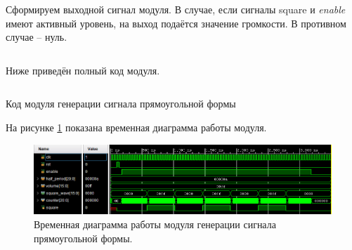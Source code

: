 \begin{listing}[H]
	\inputminted[firstline=24, lastline=33]{SystemVerilog}{code_examples/lab_7/square_code.sv}
\end{listing}

Сформируем выходной сигнал модуля. В случае, если сигналы square и \textit{enable} имеют активный уровень, на выход подаётся значение громкости. В противном случае -- нуль.

% 	

\begin{listing}[H]
	\inputminted[firstline=35, lastline=36]{SystemVerilog}{code_examples/lab_7/square_code.sv}
\end{listing}

Ниже приведён полный код модуля.

% 	

\begin{listing}[H]
	\inputminted{SystemVerilog}{code_examples/lab_7/square_code.sv}
	\caption{Код модуля генерации сигнала прямоугольной формы}
\end{listing}


На рисунке \ref{lab7:pic5} показана временная диаграмма работы модуля.

\begin{figure}[H]
	\centering
	\includegraphics [width=1\textwidth] {images/lab_7/square_simulate.PNG}
	\caption{Временная диаграмма работы модуля генерации сигнала прямоугольной формы.}
	\label{lab7:pic5}
\end{figure}


